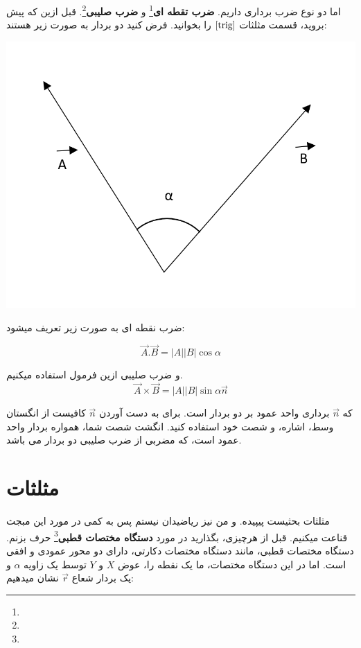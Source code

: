 \documentclass[14pt,a4paper]{memoir}
\begin{document}
	 
	 
	 اما دو نوع ضرب برداری داریم. \textbf{ضرب تقطه ای}\footnote{} و \textbf{ضرب صلیبی}\footnote{}. قبل ازین که پیش بروید، قسمت مثلثات \(\ref{trig}\) را بخوانید. فرض کنید دو بردار به صورت زیر هستند:
	 
	 
	  \begin{center}
	 	\includegraphics[scale=0.3]{Product}
	 \end{center}
	 
	 
	 ضرب نقطه ای به صورت زیر تعریف میشود:
	 
	 \[ \vec{A}.\vec{B} = |A||B|\cos \alpha \]
	 
	 و ضرب صلیبی ازین فرمول استفاده میکنیم.
	 \[ \vec{A} \times \vec{B} = |A||B|\sin \alpha \vec{n} \]
	 
	 
	 که  $\vec{n} $ برداری واحد عمود بر دو بردار است. برای به دست آوردن $\vec{n}$ کافیست از انگستان وسط، اشاره، و شصت خود استفاده کنید. انگشت شصت شما، همواره بردار واحد عمود است، که مضربی از ضرب صلیبی دو بردار می باشد.
	 
	 
	 \section{مثلثات}\label{trig}
	 
	 مثلثات بحثیست پیپیده. و من نیز ریاضیدان نیستم پس به کمی در مورد این مبجث قناعت میکنیم.  قبل از هرچیزی، بگذارید در مورد \textbf{دستگاه مختصات قطبی}\footnote{} حرف بزنم. دستگاه مختصات قطبی، مانند دستگاه مختصات دکارتی، دارای دو محور عمودی و افقی است. اما در این دستگاه مختصات، ما یک نقطه را، عوض $ X $ و $ Y $ توسط یک زاویه $ \alpha $ و یک بردار شعاع $ \vec{r} $ نشان میدهیم:
	 
\end{document}
